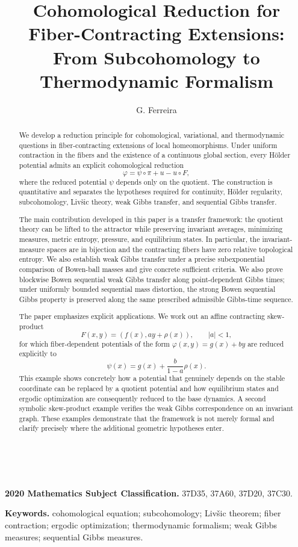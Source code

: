 \documentclass[11pt,a4paper]{article}
\title{Cohomological Reduction for Fiber-Contracting Extensions:\\
From Subcohomology to Thermodynamic Formalism}
\author{G. Ferreira}
\date{}
\newcommand{\printauthorinfo}{%
  \begin{center}
  \small
  \theaddress\\
  \href{mailto:\theemail}{\texttt{\theemail}}
  \end{center}
}
\begin{document}
\maketitle
\printauthorinfo

\begin{center}
\small
\textbf{2020 Mathematics Subject Classification.}
37D35, 37A60, 37D20, 37C30.

\textbf{Keywords.}
cohomological equation; subcohomology; Liv\v{s}ic theorem;
fiber contraction; ergodic optimization; thermodynamic formalism;
weak Gibbs measures; sequential Gibbs measures.
\end{center}

\begin{abstract}
We develop a reduction principle for cohomological, variational, and
thermodynamic questions in fiber-contracting extensions of local
homeomorphisms. Under uniform contraction in the fibers and the existence
of a continuous global section, every H\"older potential admits an explicit
cohomological reduction
\[
\varphi=\psi\circ\pi+u-u\circ F,
\]
where the reduced potential $\psi$ depends only on the quotient. The
construction is quantitative and separates the hypotheses required for
continuity, H\"older regularity, subcohomology, Liv\v{s}ic theory, weak
Gibbs transfer, and sequential Gibbs transfer.

The main contribution developed in this paper is a transfer framework: the quotient theory can be
lifted to the attractor while preserving invariant averages, minimizing
measures, metric entropy, pressure, and equilibrium states. In particular,
the invariant-measure spaces are in bijection and the contracting fibers
have zero relative topological entropy. We also establish weak Gibbs
transfer under a precise subexponential comparison of Bowen-ball masses and
give concrete sufficient criteria. We also prove blockwise Bowen sequential weak Gibbs transfer
along point-dependent Gibbs times; under uniformly bounded sequential mass
distortion, the strong Bowen sequential Gibbs property is preserved along the same prescribed admissible Gibbs-time sequence.

The paper emphasizes explicit applications. We work out an affine
contracting skew-product
\[
F(x,y)=(f(x),ay+\rho(x)),\qquad |a|<1,
\]
for which fiber-dependent potentials of the form
$\varphi(x,y)=g(x)+by$ are reduced explicitly to
\[
\psi(x)=g(x)+\frac{b}{1-a}\rho(x).
\]
This example shows concretely how a potential that genuinely depends on the
stable coordinate can be replaced by a quotient potential and how
equilibrium states and ergodic optimization are consequently reduced to the
base dynamics. A second symbolic skew-product example verifies the weak
Gibbs correspondence on an invariant graph. These examples demonstrate
that the framework is not merely formal and clarify precisely where the
additional geometric hypotheses enter.
\end{abstract}
\end{document}

